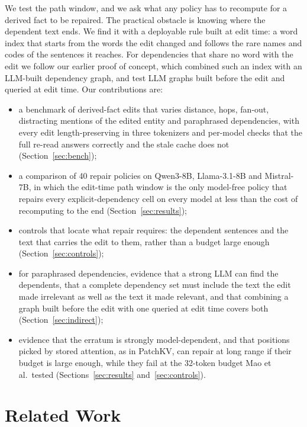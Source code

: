 \documentclass[conference]{IEEEtran}
\begin{document}
We test the path window, and we ask what any policy has to recompute for a derived fact to be repaired. The
practical obstacle is knowing where the dependent text ends. We find it with a deployable rule built at edit
time: a word index that starts from the words the edit changed and follows the rare names and codes of the
sentences it reaches. For dependencies that share no word with the edit we follow our earlier proof of concept,
which combined such an index with an LLM-built dependency graph, and test LLM graphs built before the edit and
queried at edit time. Our contributions are:
\begin{itemize}
\item a benchmark of derived-fact edits that varies distance, hops, fan-out, distracting mentions of the
edited entity and paraphrased dependencies, with every edit length-preserving in three tokenizers and
per-model checks that the full re-read answers correctly and the stale cache does not (Section~\ref{sec:bench});
\item a comparison of 40 repair policies on Qwen3-8B, Llama-3.1-8B and Mistral-7B, in which the edit-time path
window is the only model-free policy that repairs every explicit-dependency cell on every model at less than
the cost of recomputing to the end (Section~\ref{sec:results});
\item controls that locate what repair requires: the dependent sentences and the text that carries the edit to
them, rather than a budget large enough (Section~\ref{sec:controls});
\item for paraphrased dependencies, evidence that a strong LLM can find the dependents, that a complete
dependency set must include the text the edit made irrelevant as well as the text it made relevant, and that
combining a graph built before the edit with one queried at edit time covers both (Section~\ref{sec:indirect});
\item evidence that the erratum is strongly model-dependent, and that positions picked by stored attention, as
in PatchKV, can repair at long range if their budget is large enough, while they fail at the 32-token budget
Mao et al.\ tested (Sections~\ref{sec:results} and~\ref{sec:controls}).
\end{itemize}

\section{Related Work}
\end{document}
